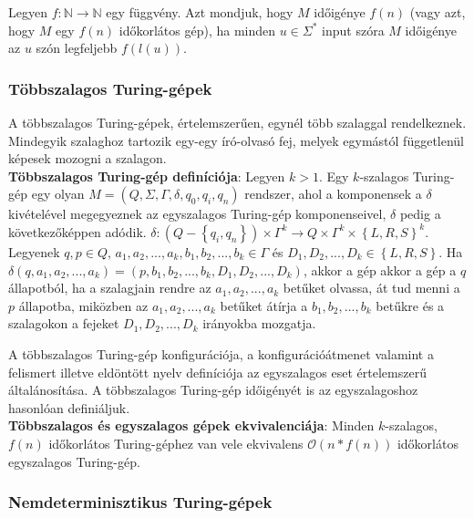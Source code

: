 \documentclass[margin=0px]{article}
\begin{document}
Legyen $f : \mathbb{N} \to \mathbb{N}$ egy függvény. Azt mondjuk, hogy $M$ időigénye $f(n)$ (vagy azt, hogy $M$
egy $f(n)$ időkorlátos gép), ha minden $u \in \Sigma^{*}$ input szóra $M$ időigénye az $u$ szón legfeljebb $f(l(u))$.

\subsubsection{Többszalagos Turing-gépek}

A többszalagos Turing-gépek, értelemszerűen, egynél több szalaggal rendelkeznek.
Mindegyik szalaghoz tartozik egy-egy író-olvasó fej, melyek egymástól
függetlenül képesek mozogni a szalagon.\\

\noindent \textbf{Többszalagos Turing-gép definíciója}: Legyen $k > 1$. Egy $k$-szalagos Turing-gép egy olyan
$M = (Q, \Sigma, \Gamma, \delta, q_{0}, q_{i}, q_{n})$ rendszer, ahol a komponensek a $\delta$ kivételével
megegyeznek az egyszalagos Turing-gép komponenseivel, $\delta$ pedig a következőképpen adódik.
$\delta : (Q - \left\{q_{i},q_{n}\right\}) \times \Gamma^{k} \to Q \times \Gamma^{k} \times \left\{L, R, S\right\}^{k}$.
Legyenek $q, p \in Q$, $a_{1}, a_{2}, ... , a_{k}, b_{1}, b_{2}, ..., b_{k} \in \Gamma$ és
$D_{1}, D_{2}, ..., D_{k} \in \left\{L, R, S\right\}$. Ha $\delta(q,a_{1}, a_{2}, ... , a_{k}) = (p,b_{1}, b_{2}, ..., b_{k}, D_{1}, D_{2}, ..., D_{k})$, akkor a gép akkor a gép a $q$ állapotból, ha a szalagjain rendre az
$a_{1}, a_{2}, ... , a_{k}$ betűket olvassa, át tud menni a $p$ állapotba, miközben az
$a_{1}, a_{2}, ... , a_{k}$ betűket átírja a $b_{1}, b_{2}, ... , b_{k}$ betűkre és a szalagokon a fejeket
$D_{1}, D_{2}, ... , D_{k}$ irányokba mozgatja.

A többszalagos Turing-gép konfigurációja, a konfigurációátmenet valamint a
felismert illetve eldöntött nyelv definíciója az egyszalagos eset értelemszerű általánosítása.
A többszalagos Turing-gép időigényét is az egyszalagoshoz hasonlóan	definiáljuk.\\

\noindent \textbf{Többszalagos és egyszalagos gépek ekvivalenciája}: Minden $k$-szalagos, $f(n)$ időkorlátos Turing-géphez
van vele ekvivalens $\mathcal{O}(n*f(n))$ időkorlátos egyszalagos Turing-gép.

\subsubsection{Nemdeterminisztikus Turing-gépek}
\end{document}
